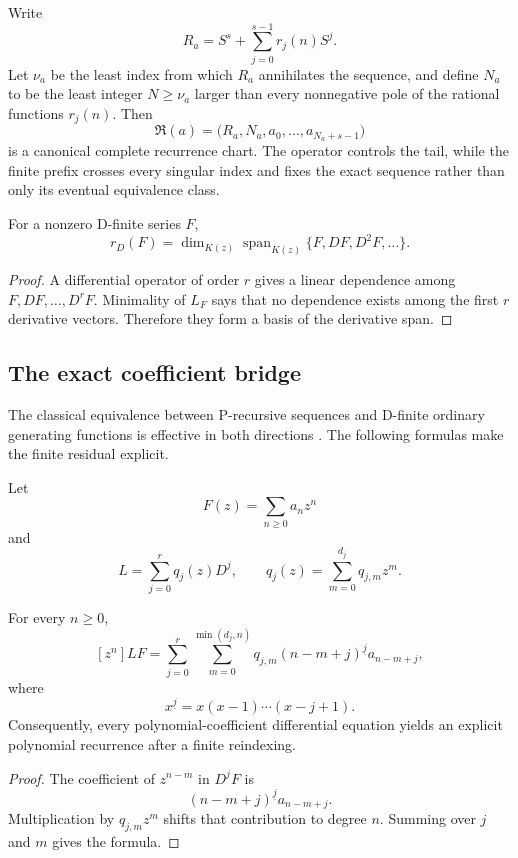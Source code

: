 Write
\[
 R_a
 =
 S^s+\sum_{j=0}^{s-1}r_j(n)S^j.
\]
Let $\nu_a$ be the least index from which $R_a$ annihilates the sequence, and define $N_a$ to be the least integer $N\geq\nu_a$ larger than every nonnegative pole of the rational functions $r_j(n)$.  Then
\[
 \mathfrak R(a)
 =
 \bigl(R_a,N_a,a_0,\ldots,a_{N_a+s-1}\bigr)
\]
is a canonical complete recurrence chart.  The operator controls the tail, while the finite prefix crosses every singular index and fixes the exact sequence rather than only its eventual equivalence class.

\begin{proposition}
\label{prop:block09-derivative-rank}
For a nonzero D-finite series $F$,
\[
 \boxed{
 r_D(F)
 =
 \dim_{K(z)}\operatorname{span}_{K(z)}
 \{F,DF,D^2F,\ldots\}.}
\]
\end{proposition}

\begin{proof}
A differential operator of order $r$ gives a linear dependence among $F,DF,\ldots,D^rF$.  Minimality of $L_F$ says that no dependence exists among the first $r$ derivative vectors.  Therefore they form a basis of the derivative span.
\end{proof}

\subsection{The exact coefficient bridge}
\label{subsec:block09-coefficient-bridge}

The classical equivalence between P-recursive sequences and D-finite ordinary generating functions is effective in both directions \cite{Stanley1980}.  The following formulas make the finite residual explicit.

Let
\[
 F(z)=\sum_{n\geq0}a_nz^n
\]
and
\[
 L
 =
 \sum_{j=0}^{r}q_j(z)D^j,
 \qquad
 q_j(z)=\sum_{m=0}^{d_j}q_{j,m}z^m.
\]

\begin{theorem}
\label{thm:block09-diff-to-rec}
For every $n\geq0$,
\[
 \boxed{
 [z^n]LF
 =
 \sum_{j=0}^{r}
 \sum_{m=0}^{\min(d_j,n)}
 q_{j,m}
 (n-m+j)^{\underline{j}}
 a_{n-m+j},}
\]
where
\[
 x^{\underline j}=x(x-1)\cdots(x-j+1).
\]
Consequently, every polynomial-coefficient differential equation yields an explicit polynomial recurrence after a finite reindexing.
\end{theorem}

\begin{proof}
The coefficient of $z^{n-m}$ in $D^jF$ is
\[
 (n-m+j)^{\underline j}a_{n-m+j}.
\]
Multiplication by $q_{j,m}z^m$ shifts that contribution to degree $n$.  Summing over $j$ and $m$ gives the formula.
\end{proof}

